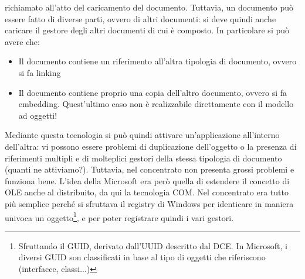 richiamato all'atto del caricamento del documento.
Tuttavia, un documento può essere fatto di diverse parti, ovvero di altri documenti: si deve quindi anche caricare il
gestore degli altri documenti di cui è composto. In particolare si può avere che:
\begin{itemize}
 \item Il documento contiene un riferimento all'altra tipologia di documento, ovvero si fa linking
 \item Il documento contiene proprio una copia dell'altro documento, ovvero si fa embedding. Quest'ultimo caso non è
 realizzabile direttamente con il modello ad oggetti!
\end{itemize}
Mediante questa tecnologia si può quindi attivare un'applicazione all'interno dell'altra: vi possono essere problemi di
duplicazione dell'oggetto o la presenza di riferimenti multipli e di molteplici gestori della stessa tipologia di
documento (quanti ne attiviamo?). Tuttavia, nel concentrato non presenta grossi problemi e funziona bene.
L'idea della Microsoft era però quella di estendere il concetto di OLE anche al distribuito, da qui la tecnologia COM.
Nel concentrato era tutto più semplice perché si sfruttava il registry di Windows per identicare in maniera univoca un
oggetto\footnote{Sfruttando il GUID, derivato dall'UUID descritto dal DCE. In Microsoft, i diversi GUID son classificati
in base al tipo di oggetti che riferiscono (interfacce, classi...)}, e per poter registrare quindi i vari gestori.
